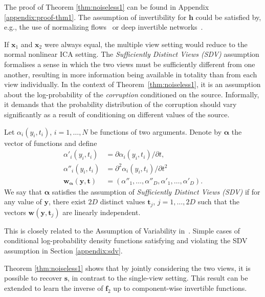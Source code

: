 The proof of Theorem \ref{thm:noiseless1} can be found in Appendix \ref{appendix:proof-thm1}.
The assumption of invertibility for $\bm{h}$ could be satisfied by, e.g., the use of normalizing flows~\citep{rezende2015variational, chen2018neural} or deep invertible networks~\citep{jacobsen_hal-01712808}.


If $\bm{x}_1$ and $\bm{x}_2$ were always equal, the multiple view setting would reduce to the normal nonlinear ICA setting.
The \emph{Sufficiently Distinct Views (SDV)} assumption formalises a sense in which the two views must be sufficiently different from one another,
resulting in more information being available in totality than from each view individually.
In the context of Theorem~\ref{thm:noiseless1}, it is an assumption about the log-probability of the \emph{corruption} conditioned on the source.
Informally, it demands that the probability distribution of the corruption should vary significantly as a result of conditioning on different values of the source.

\medskip

\begin{definition}\label{suff_dist_assumption}
	Let $\alpha_i(y_i, t_i)$, $i=1,\ldots, N$ be functions of two arguments.
	Denote by $\bm\alpha$ the vector of functions and define
	\begin{align}
	\alpha'_{i}(y_i, t_i)&= \partial \alpha_{i}(y_i, t_i)/\partial t, \label{eq:convention1}\\
	\alpha''_{i}(y_i, t_i)&=\partial^2 \alpha_{i}(y_i, t_i)/\partial t^2\, \label{eq:convention2}\\
	\bm{w}_{\bm\alpha}(\bm{y}, \bm{t}) &= (\alpha''_{1}, \ldots, \alpha''_{D}, \alpha'_{1}, \ldots,\alpha'_{D}).
	\end{align}
	We say that $\bm{\alpha}$ satisfies the assumption of \emph{Sufficiently Distinct Views (SDV)} if for any value of $\bm{y}$, there exist $2D$ distinct values $\bm{t}_j$, $j=1, \ldots, 2D$ such that the vectors $\bm{w}(\bm{y},\bm{t}_j)$ are linearly independent.
	\\    \end{definition}
This is closely related to the Assumption of Variability in~\cite{hyvarinen19a}.
Simple cases of conditional log-probability density functions satisfying and violating the SDV assumption in Section \ref{appendix:sdv}.

Theorem \ref{thm:noiseless1} shows that by jointly considering the two views, it is possible to recover $\bm{s}$, in contrast to the single-view setting.
This result can be extended to learn the inverse of $\bm{f}_2$ up to component-wise invertible functions.

